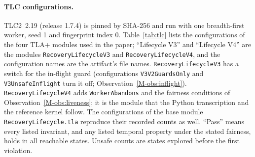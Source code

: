 \documentclass[pdflatex,sn-mathphys-num]{sn-jnl}
\newcommand{\code}[1]{\texttt{#1}}
\theoremstyle{plain}
\begin{document}
\paragraph{TLC configurations.}
TLC2~2.19 (release 1.7.4) is pinned by SHA-256 and run with one breadth-first worker, seed 1 and fingerprint index 0. Table~\ref{tab:tlc} lists the configurations of the four TLA+ modules used in the paper; ``Lifecycle V3'' and ``Lifecycle V4'' are the modules \code{RecoveryLifecycleV3} and \code{RecoveryLifecycleV4}, and the configuration names are the artifact's file names. \code{RecoveryLifecycleV3} has a switch for the in-flight guard (configurations \code{V3V2GuardsOnly} and \code{V3UnsafeInflight} turn it off; Observation~\ref{M-obs:inflight}). \code{RecoveryLifecycleV4} adds \code{WorkerAbandons} and the fairness conditions of Observation~\ref{M-obs:liveness}; it is the module that the Python transcription and the reference kernel follow. The configurations of the base module \code{RecoveryLifecycle.tla} reproduce their recorded counts as well. ``Pass'' means every listed invariant, and any listed temporal property under the stated fairness, holds in all reachable states. Unsafe counts are states explored before the first violation.
\end{document}
